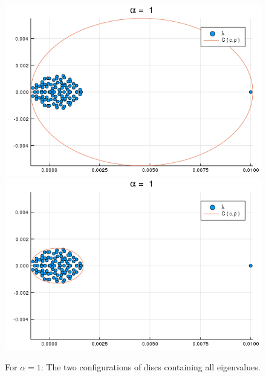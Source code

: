 \begin{figure}[h!]
\centering
\includegraphics[scale=0.4]{../task2/images/Task2_b_a1_1.png}
\includegraphics[scale=0.4]{../task2/images/Task2_b_a1_2.png}
\caption{For $\alpha = 1$: The two configurations of discs containing all eigenvalues.}
\label{fig:task2b_1}
\end{figure}

